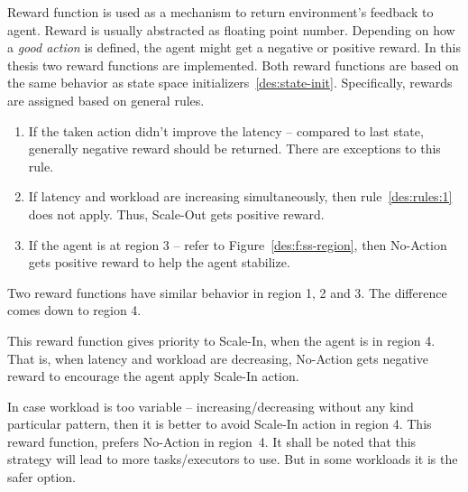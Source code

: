 Reward function is used as a mechanism to return environment's feedback to agent. Reward is usually abstracted as floating point number. Depending on how a \emph{good action} is defined, the agent might get a negative or positive reward. In this thesis two reward functions are implemented. Both reward functions are based on the same behavior as state space initializers~\ref{des:state-init}. Specifically, rewards are assigned based on general rules.
\begin{enumerate}
    \item \label{des:rules:1} If the taken action didn't improve the latency -- compared to last state, generally negative reward should be returned. There are exceptions to this rule.
    \item If latency and workload are increasing simultaneously, then rule~\ref{des:rules:1} does not apply. Thus, Scale-Out gets positive reward.
    \item If the agent is at region 3 -- refer to Figure~\ref{des:f:ss-region}, then No-Action gets positive reward to help the agent stabilize.
\end{enumerate}
Two reward functions have similar behavior in region 1, 2 and 3. The difference comes down to region 4.
\begin{description}[leftmargin=0pt]
    \item[Prefer Scale-In When Load is Decreasing] This reward function gives priority to Scale-In, when the agent is in region 4. That is, when latency and workload are decreasing, No-Action gets negative reward to encourage the agent apply Scale-In action.
    \item[Prefer No-Action When Load is Decreasing] In case workload is too variable -- increasing/decreasing without any kind particular pattern, then it is better to avoid Scale-In action in region 4. This reward function, prefers No-Action in region~4. It shall be noted that this strategy will lead to more tasks/executors to use. But in some workloads it is the safer option. 
\end{description}

